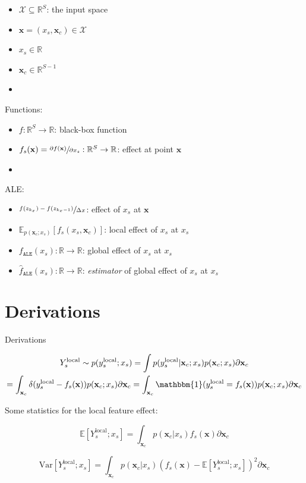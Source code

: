\documentclass[wcp]{jmlr}
\newcommand{\xc}{\mathbf{x}_c}
\newcommand{\Ysloc}{Y_{s}^{\text{local}}}
\newcommand{\ysloc}{y_{s}^{\text{local}}}
\newcommand{\x}{\mathbf{x}}
\newcommand{\E}{\mathbb{E}}
\newcommand{\var}{\mathrm{Var}}
\newcommand{\R}{\mathbb{R}}
\newcommand{\1}{\mathbbm{1}}
\begin{document}
\begin{itemize}
\item \(\mathcal{X} \subseteq \R^S \): the input space
\item \(\x = (x_s, \xc) \in \mathcal{X}\)
\item \(x_s \in \R \)
\item \(\xc \in \R^{S-1}\)
\item
\end{itemize}
%
Functions:
\begin{itemize}
\item \(f: \R^S \rightarrow \R\): black-box function
\item \(f_s(\x) = \sfrac{\partial f(\x)}{\partial x_s}: \R^S \rightarrow \R\): effect at point \(\x\)
\item 
\end{itemize}
%
ALE:
\begin{itemize}
\item \(\sfrac{f(z_{k_x}) - f(z_{k_x-1})}{\Delta x}\): effect of \(x_s\) at \(\x\)
\item \(\E_{p(\xc;x_s)}[f_s(x_s, \xc)]\): local effect of \(x_s\) at \(x_s\)
\item \(f_{\texttt{ALE}}(x_s): \R \rightarrow \R\): global effect of \(x_s\) at \(x_s\)
\item \(\hat{f}_{\texttt{ALE}}(x_s): \R \rightarrow \R\): \textit{estimator} of global effect of \(x_s\) at \(x_s\)
\end{itemize}

\section{Derivations}\label{apd:derivations}

Derivations

\begin{multline}
    \Ysloc \sim p(\ysloc ; x_s)
    = \int{} p(\ysloc|\xc;x_s) p(\xc;x_s) \partial \xc \\
    = \int_{\xc} \delta(\ysloc-f_s(\x)) p(\xc;x_s) \partial \xc
    = \int_{\xc} \1(\ysloc=f_s(\x)) p(\xc;x_s) \partial \xc
\end{multline}

Some statistics for the local feature effect:

\begin{equation}
  \E[ \Ysloc ; x_s] = \int_{\xc} p(\xc|x_s) f_s(\x) \partial \xc
\end{equation}

\begin{equation}
  \var[ \Ysloc ; x_s] = \int_{\xc} p(\xc|x_s) (f_s(\x) - \E[ \Ysloc ; x_s])^2 \partial \xc
\end{equation}
\end{document}
